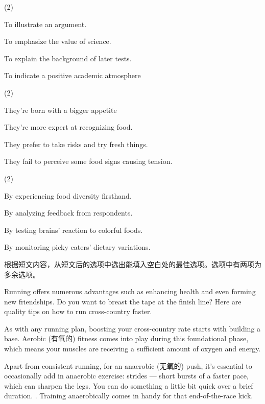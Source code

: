 \documentclass{英语试卷}
\begin{document}
\begin{choices}(2)
  \item To illustrate an argument.
  \item To emphasize the value of science.
  \item To explain the background of later tests.
  \item To indicate a positive academic atmosphere
\end{choices}
\begin{choices}(2)
  \item They're born with a bigger appetite
  \item They're more expert at recognizing food.
  \item They prefer to take risks and try fresh things.
  \item They fail to perceive some food signs causing tension.
\end{choices}
\begin{choices}(2)
  \item By experiencing food diversity firsthand.
  \item By analyzing feedback from respondents.
  \item By testing brains' reaction to colorful foods.
  \item By monitoring picky eaters' dietary variations.
\end{choices}
\par 根据短文内容，从短文后的选项中选出能填入空白处的最佳选项。选项中有两项为多余选项。\par
\par Running offers numerous advantages such as enhancing health and even forming new friendships.  Do you want to breast the tape at the finish line? Here are quality tips on how to run cross-country faster.\par
\par As with any running plan, boosting your cross-country rate starts with building a base. Aerobic (有氧的) fitness comes into play during this foundational phase, which means your muscles are receiving a sufficient amount of oxygen and energy. \par
\par Apart from consistent running, for an anaerobic (无氧的) push, it's essential to occasionally add in anaerobic exercise: strides — short bursts of a faster pace, which can sharpen the legs. You can do something a little bit quick over a brief duration. . Training anaerobically comes in handy for that end-of-the-race kick.\par
\end{document}
